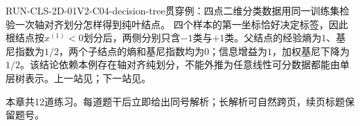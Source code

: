 \begin{SLRunningExample}{RUN-CLS-2D-01}{V2-C04-decision-tree}{贯穿例：四点二维分类数据}{用同一训练集检验一次轴对齐划分怎样得到纯叶结点。}
四个样本的第一坐标恰好决定标签，因此根结点按$x^{(1)}<0$划分后，两侧分别只含$-1$类与$+1$类。父结点的经验熵为$1$、基尼指数为$1/2$，两个子结点的熵和基尼指数均为$0$；信息增益为$1$，加权基尼下降为$1/2$。该结论依赖本例存在轴对齐纯划分，不能外推为任意线性可分数据都能由单层树表示。上一站见；下一站见。
\end{SLRunningExample}


\label{struct:V2-C04-CH34}
\begin{chapterexercisebox}
\label{struct:V2-C04-CH35}
本章共12道练习。每道题干后立即给出同号解析；长解析可自然跨页，续页标题保留题号。
\end{chapterexercisebox}

